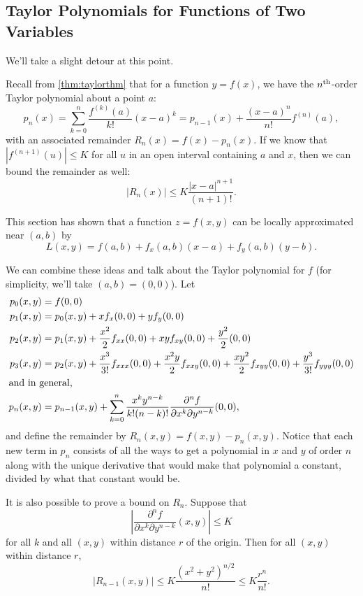 \documentclass{amsart}
\newcommand{\abs}[1]{\left\lvert#1\right\rvert}
\begin{document}
\subsection*{Taylor Polynomials for Functions of Two Variables}

We'll take a slight detour at this point.

Recall from \ref{thm:taylorthm} that for a function $y=f(x)$, we have the $n\textsuperscript{th}$-order Taylor polynomial about a point $a$:
\[
 p_n(x)
 =\sum_{k=0}^n\frac{f^{(k)}(a)}{k!}(x-a)^k
 =p_{n-1}(x)+\frac{(x-a)^n}{n!}f^{(n)}(a),
\]
with an associated remainder $R_n(x)=f(x)-p_n(x)$.  If we know that $\abs{f^{(n+1)}(u)}\le K$ for all $u$ in an open interval containing $a$ and $x$, then we can bound the remainder as well:
\[\abs{R_n(x)}\le K\frac{\abs{x-a}^{n+1}}{(n+1)!}.\]

This section has shown that a function $z=f(x,y)$ can be locally approximated near $(a,b)$ by
\[ L(x,y)=f(a,b)+f_x(a,b)(x-a)+f_y(a,b)(y-b). \]

We can combine these ideas and talk about the Taylor polynomial for $f$ (for simplicity, we'll take $(a,b)=(0,0)$). Let
\begin{align*}\index{Taylor Series!multivariable}
 p_0(x,y)&=f(0,0) \\
 p_1(x,y)&=p_0(x,y)+xf_x(0,0)+yf_y(0,0) \\
 p_2(x,y)&=p_1(x,y)+\frac{x^2}2f_{xx}(0,0)+xyf_{xy}(0,0)+\frac{y^2}2(0,0) \\
 p_3(x,y)&=p_2(x,y)+\frac{x^3}{3!}f_{xxx}(0,0)+\frac{x^2y}2f_{xxy}(0,0)
 +\frac{xy^2}2f_{xyy}(0,0)+\frac{y^3}{3!}f_{yyy}(0,0) \\
 \intertext{and in general,}
 p_n(x,y)&=p_{n-1}(x,y)+\sum_{k=0}^n\frac{x^k y^{n-k}}{k!(n-k)!}
 \frac{\partial^n f}{\partial x^k\partial y^{n-k}}(0,0),
\end{align*}
and define the remainder by $R_n(x,y)=f(x,y)-p_n(x,y)$. Notice that each new term in $p_n$ consists of all the ways to get a polynomial in $x$ and $y$ of order $n$ along with the unique derivative that would make that polynomial a constant, divided by what that constant would be.

It is also possible to prove a bound on $R_n$.  Suppose that
\[\abs{\frac{\partial^n f}{\partial x^k\partial y^{n-k}}(x,y)}\le K\]
for all $k$ and all $(x,y)$ within distance $r$ of the origin. Then for all $(x,y)$ within distance $r$,
\[
 \abs{R_{n-1}(x,y)}
 \le K\frac{(x^2+y^2)^{n/2}}{n!}
 \le K\frac{r^n}{n!}.
\]
\end{document}
